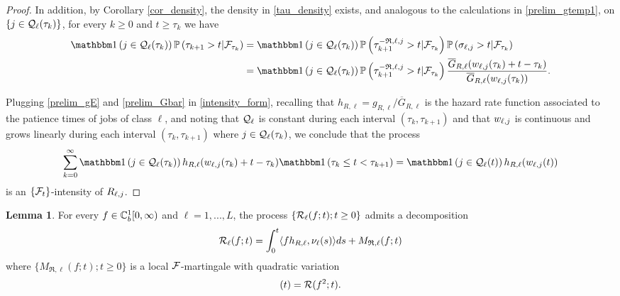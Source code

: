 \documentclass{article}
\theoremstyle{definition}
\newtheorem{lemma}[theorem]{Lemma}
\numberwithin{equation}{section}
\begin{document}
\begin{proof}
In addition, by Corollary \ref{cor_density}, the density in \eqref{tau_density} exists, and analogous to the calculations in \eqref{prelim_gtemp1}, on $\{j \in\mathcal{Q}_\ell(\tau_k)\}$, for every $k\ge0$ and $t\geq \tau_k$ we have
\begin{align}\label{prelim_Gbar}
  \indic{j\in\inque_\ell(\tau_k)}\Prob{\tau_{k+1}>t|\filt_{\tau_k}} &= \indic{j\in\inque_\ell(\tau_k)}\Prob{ \tau_{k+1}^{-\mathfrak{R},\ell,j}>t |\filt_{\tau_k}}\Prob{ \renegtime_{\ell,j}>t |\filt_{\tau_k}}\notag\\
  &=  \indic{j\in\inque_\ell(\tau_k)} \Prob{\tau_{k+1}^{-\mathfrak{R},\ell,j}>t|\filt_{\tau_k}} \frac{\overline G_{R,\ell}(\waiting_{\ell,j}(\tau_k)+t-\tau_k)} {\overline G_{R,\ell}(\waiting_{\ell,j}(\tau_k))} .
\end{align}

Plugging \eqref{prelim_gE} and \eqref{prelim_Gbar}  in \eqref{intensity_form}, recalling that $h_{R,\ell}=g_{R,\ell}/\overline G_{R,\ell}$ is the hazard rate function associated to the patience times of jobs of class $\ell$, and noting that $\mathcal{Q}_\ell$ is constant during each interval   $(\tau_k,\tau_{k+1})$ and that $w_{\ell,j}$ is continuous and grows linearly during each interval $(\tau_k,\tau_{k+1})$ where $j\in\mathcal{Q}_\ell(\tau_k)$, we conclude that the process
\begin{align*}
  \sum_{k=0}^\infty \indic{j\in\inque_\ell(\tau_k)} h_{R,\ell}(\waiting_{\ell,j}(\tau_k)+t-\tau_k)\indic{\tau_k \leq t < \tau_{k+1}} = \indic{j\in\inque_\ell(t)} h_{R,\ell}(\waiting_{\ell,j}(t))
\end{align*}
is an $\{\mathcal{F}_t\}$-intensity of $R_{\ell,j}$.
\end{proof}


\begin{lemma}\label{prop_Rdecomp}
  For every $f\in\mathbb{C}_b^{1}[0,\infty)$ and $\ell=1,...,L$, the process $\{\mathcal{R}_\ell(f;t);t\geq0\}$ admits a decomposition
  \begin{equation}\label{Rdecomp}
    \mathcal{R}_\ell(f;t)= \int_0^t \langle fh_{R,\ell},\nu_\ell(s)\rangle ds +M_{\mathfrak{R},\ell}(f;t)
  \end{equation}
  where $\{M_{\mathfrak{R},\ell}(f;t);t\geq0\}$ is a local $\mathcal{F}$-martingale with quadratic variation
\begin{equation}
  [M_{\mathfrak{R},\ell}(f;\cdot)](t)=\renegC(f^2;t).
\end{equation}
\end{lemma}
\end{document}
